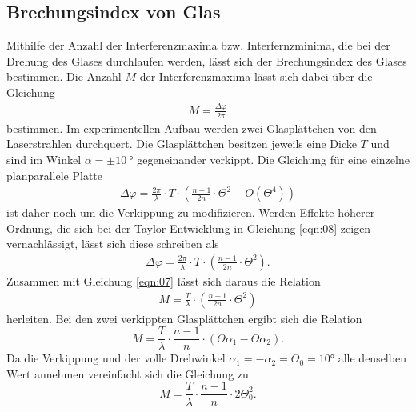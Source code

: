 \subsection{Brechungsindex von Glas}
\noindent Mithilfe der Anzahl der Interferenzmaxima bzw. Interfernzminima, die
bei der Drehung des Glases durchlaufen werden, lässt sich der Brechungsindex des
Glases bestimmen. Die Anzahl $M$ der Interferenzmaxima lässt sich dabei über die
Gleichung
\begin{align}
  M = \frac{\Delta \varphi}{2 \pi}
  \label{eqn:07}
\end{align}
\noindent bestimmen. Im experimentellen Aufbau werden zwei Glasplättchen von den
Laserstrahlen durchquert. Die Glasplättchen besitzen jeweils eine Dicke $T$ und
sind im Winkel $\alpha = \pm \SI{10}{\degree}$ gegeneinander verkippt. Die
Gleichung für eine einzelne planparallele Platte
\begin{align}
  \Delta \varphi = \frac{2 \pi}{\lambda} \cdot T \cdot \left(\frac{n-1}{2n} \cdot \Theta^2 + O(\Theta^4)  \right)
  \label{eqn:08}
\end{align}
\noindent ist daher noch um die Verkippung zu modifizieren. Werden
Effekte höherer Ordnung, die sich bei der Taylor-Entwicklung in Gleichung
\ref{eqn:08} zeigen vernachlässigt, lässt sich diese schreiben als
\begin{align}
  \Delta \varphi = \frac{2 \pi}{\lambda} \cdot T \cdot \left(\frac{n-1}{2n} \cdot \Theta^2  \right).
  \label{eqn:09}
\end{align}
\noindent Zusammen mit Gleichung \ref{eqn:07} lässt sich daraus die Relation
\begin{align}
  M = \frac{T}{\lambda} \cdot \left( \frac{n-1}{2n} \cdot \Theta^2  \right)
  \label{eqn:10}
\end{align}
herleiten. Bei den zwei verkippten Glasplättchen ergibt sich die Relation
\begin{equation}
  M = \frac{T}{\lambda} \cdot \frac{n-1}{n} \cdot (\Theta \alpha_1 - \Theta \alpha_2).
\end{equation}
Da die Verkippung und der volle Drehwinkel $\alpha_1 = - \alpha_2 = \Theta_0 = 10°$ alle denselben Wert
annehmen vereinfacht sich die Gleichung zu
\begin{equation}
  M = \frac{T}{\lambda} \cdot \frac{n-1}{n} \cdot 2\Theta_0^2.
  \label{eqn:M_modifiziert}
\end{equation}
